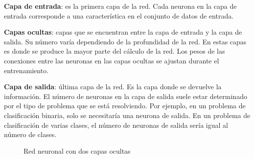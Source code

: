 \textbf{Capa de entrada}: es la primera capa de la red. Cada neurona en la capa de entrada corresponde a una característica en el conjunto de datos de entrada.

\textbf{Capas ocultas}: capas que se encuentran entre la capa de entrada y la capa de salida. Su número varía dependiendo de la profundidad de la red. 
En estas capas es donde se produce la mayor parte del cálculo de la red. Los pesos de las conexiones entre las neuronas en las capas ocultas se ajustan durante el entrenamiento.

\textbf{Capa de salida}: última capa de la red. Es la capa donde se devuelve la información. El número de neuronas en la capa de salida suele estar determinado por el tipo de problema que se está resolviendo. Por ejemplo, en un problema de clasificación binaria, solo se necesitaría una neurona de salida. En un problema de clasificación de varias clases, el número de neuronas de salida sería igual al número de clases.

\begin{figure}
\centering
{}
\caption{Red neuronal con dos capas ocultas \cite{Wikilibros}}
\end{figure}

